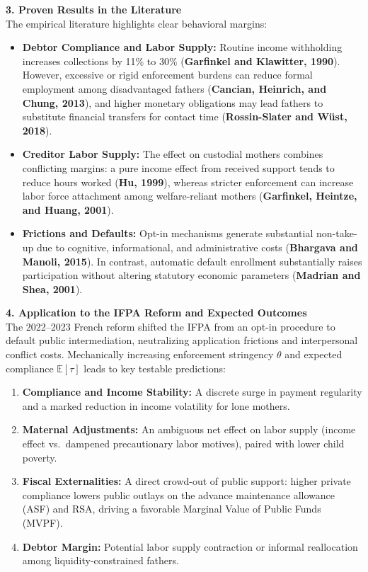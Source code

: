 \documentclass[11pt,a4paper]{article}
\begin{document}
\vspace{0.35cm}
\noindent\textbf{3. Proven Results in the Literature} \\
The empirical literature highlights clear behavioral margins:
\begin{itemize}
    \setlength\itemsep{0.15em}
    \item \textbf{Debtor Compliance and Labor Supply:} Routine income withholding increases collections by 11\% to 30\% (\textbf{Garfinkel and Klawitter, 1990}). However, excessive or rigid enforcement burdens can reduce formal employment among disadvantaged fathers (\textbf{Cancian, Heinrich, and Chung, 2013}), and higher monetary obligations may lead fathers to substitute financial transfers for contact time (\textbf{Rossin-Slater and Wüst, 2018}).
    \item \textbf{Creditor Labor Supply:} The effect on custodial mothers combines conflicting margins: a pure income effect from received support tends to reduce hours worked (\textbf{Hu, 1999}), whereas stricter enforcement can increase labor force attachment among welfare-reliant mothers (\textbf{Garfinkel, Heintze, and Huang, 2001}).
    \item \textbf{Frictions and Defaults:} Opt-in mechanisms generate substantial non-take-up due to cognitive, informational, and administrative costs (\textbf{Bhargava and Manoli, 2015}). In contrast, automatic default enrollment substantially raises participation without altering statutory economic parameters (\textbf{Madrian and Shea, 2001}).
\end{itemize}

\vspace{0.35cm}
\noindent\textbf{4. Application to the IFPA Reform and Expected Outcomes} \\
The 2022--2023 French reform shifted the IFPA from an opt-in procedure to default public intermediation, neutralizing application frictions and interpersonal conflict costs. Mechanically increasing enforcement stringency $\theta$ and expected compliance $\mathbb{E}[\tau]$ leads to key testable predictions:
\begin{enumerate}
    \setlength\itemsep{0.15em}
    \item \textbf{Compliance and Income Stability:} A discrete surge in payment regularity and a marked reduction in income volatility for lone mothers.
    \item \textbf{Maternal Adjustments:} An ambiguous net effect on labor supply (income effect vs.\ dampened precautionary labor motives), paired with lower child poverty.
    \item \textbf{Fiscal Externalities:} A direct crowd-out of public support: higher private compliance lowers public outlays on the advance maintenance allowance (ASF) and RSA, driving a favorable Marginal Value of Public Funds (MVPF).
    \item \textbf{Debtor Margin:} Potential labor supply contraction or informal reallocation among liquidity-constrained fathers.
\end{enumerate}
\end{document}
